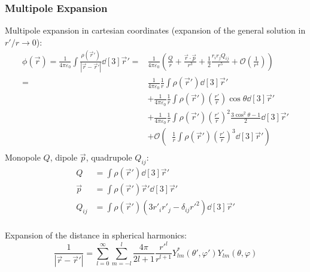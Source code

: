 		\subsubsection{Multipole Expansion}
			\noindent
			Multipole expansion in cartesian coordinates (expansion of the general solution in $r'/r \to 0$):
			\begin{equation}
				\begin{aligned}
					\phi(\vec{r}) = \frac{1}{4\pi\varepsilon_0}\int\frac{\rho(\vec{r}')}{\left|\vec{r}-\vec{r}'\right|}\dd[3]{\vec{r}'}
					=& \frac{1}{4\pi\varepsilon_0}\left(\frac{Q}{r} + \frac{\vec{r}\cdot\vec{p}}{r^3} + \frac{1}{2}\frac{r_i r_j Q_{ij}}{r^5} + \mathcal{O} \left(\frac{1}{r^4}\right)\right) \\
					=& \frac{1}{4\pi\varepsilon_0}\frac{1}{r}\int\rho(\vec{r}')\dd[3]{\vec{r}'} \\
					&+ \frac{1}{4\pi\varepsilon_0}\frac{1}{r}\int\rho(\vec{r}')\left(\frac{r'}{r}\right)\cos\theta\dd[3]{\vec{r}'} \\
					&+ \frac{1}{4\pi\varepsilon_0}\frac{1}{r}\int\rho(\vec{r}')\left(\frac{r'}{r}\right)^2\frac{3\cos^2\theta-1}{2}\dd[3]{\vec{r}'} \\
					&+ \mathcal{O}\left(\;\;\frac{1}{r}\int\rho(\vec{r}')\left(\frac{r'}{r}\right)^3 \dd[3]{\vec{r}'}\right) \\
				\end{aligned}
			\end{equation}
			Monopole $Q$, dipole $\vec{p}$, quadrupole $Q_{ij}$:
			\begin{equation}
				\begin{aligned}
					Q &= \int \rho(\vec{r}') \dd[3]{\vec{r}'} \\
					\vec{p} &= \int \rho(\vec{r}')\vec{r}' \dd[3]{\vec{r}'} \\
					Q_{ij} &= \int \rho(\vec{r}')\left(3r'_i r'_j - \delta_{ij} r'^2 \right)	\dd[3]{\vec{r}'} \\
				\end{aligned}
			\end{equation}

			\noindent
			Expansion of the distance in spherical harmonics:
			\begin{equation}
				\frac{1}{\left|\vec{r}-\vec{r}'\right|}=\sum_{l=0}^{\infty}\sum_{m=-l}^{l} \frac{4\pi}{2l+1}\frac{r'^l}{r^{l+1}} Y^{*}_{lm}(\theta',\varphi')Y_{lm}(\theta,\varphi)
			\end{equation}

